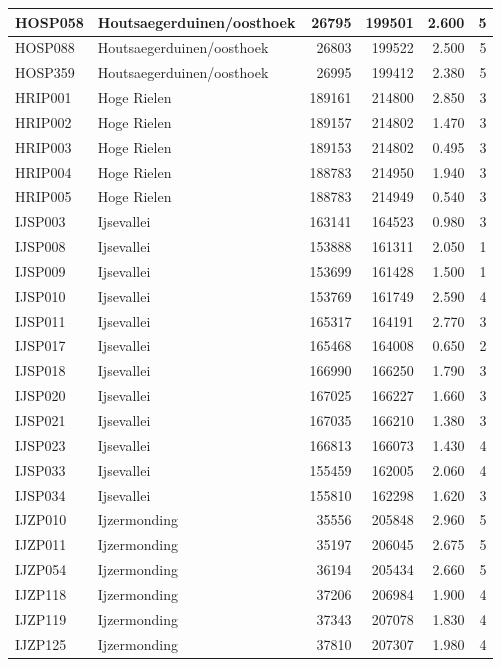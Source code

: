 \documentclass[11pt,]{book}
\begin{document}
\begin{table}
\begin{tabular}[t]{l|l|r|r|r|r}
\hline
HOSP058 & Houtsaegerduinen/oosthoek & 26795 & 199501 & 2.600 & 5\\
\hline
HOSP088 & Houtsaegerduinen/oosthoek & 26803 & 199522 & 2.500 & 5\\
\hline
HOSP359 & Houtsaegerduinen/oosthoek & 26995 & 199412 & 2.380 & 5\\
\hline
HRIP001 & Hoge Rielen & 189161 & 214800 & 2.850 & 3\\
\hline
HRIP002 & Hoge Rielen & 189157 & 214802 & 1.470 & 3\\
\hline
HRIP003 & Hoge Rielen & 189153 & 214802 & 0.495 & 3\\
\hline
HRIP004 & Hoge Rielen & 188783 & 214950 & 1.940 & 3\\
\hline
HRIP005 & Hoge Rielen & 188783 & 214949 & 0.540 & 3\\
\hline
IJSP003 & Ijsevallei & 163141 & 164523 & 0.980 & 3\\
\hline
IJSP008 & Ijsevallei & 153888 & 161311 & 2.050 & 1\\
\hline
IJSP009 & Ijsevallei & 153699 & 161428 & 1.500 & 1\\
\hline
IJSP010 & Ijsevallei & 153769 & 161749 & 2.590 & 4\\
\hline
IJSP011 & Ijsevallei & 165317 & 164191 & 2.770 & 3\\
\hline
IJSP017 & Ijsevallei & 165468 & 164008 & 0.650 & 2\\
\hline
IJSP018 & Ijsevallei & 166990 & 166250 & 1.790 & 3\\
\hline
IJSP020 & Ijsevallei & 167025 & 166227 & 1.660 & 3\\
\hline
IJSP021 & Ijsevallei & 167035 & 166210 & 1.380 & 3\\
\hline
IJSP023 & Ijsevallei & 166813 & 166073 & 1.430 & 4\\
\hline
IJSP033 & Ijsevallei & 155459 & 162005 & 2.060 & 4\\
\hline
IJSP034 & Ijsevallei & 155810 & 162298 & 1.620 & 3\\
\hline
IJZP010 & Ijzermonding & 35556 & 205848 & 2.960 & 5\\
\hline
IJZP011 & Ijzermonding & 35197 & 206045 & 2.675 & 5\\
\hline
IJZP054 & Ijzermonding & 36194 & 205434 & 2.660 & 5\\
\hline
IJZP118 & Ijzermonding & 37206 & 206984 & 1.900 & 4\\
\hline
IJZP119 & Ijzermonding & 37343 & 207078 & 1.830 & 4\\
\hline
IJZP125 & Ijzermonding & 37810 & 207307 & 1.980 & 4\\

\end{tabular}
\end{table}
\end{document}
